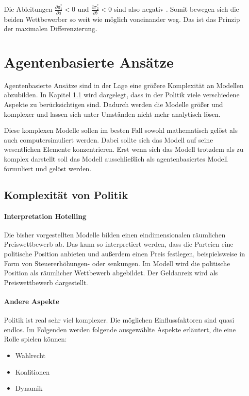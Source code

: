 Die Ableitungen $\frac{\partial \pi_1^*}{\partial a}<0$ und $\frac{\partial \pi_2^*}{\partial b}<0$ sind also negativ \citep[S.\,1149]{aspremont1979}.
Somit bewegen sich die beiden Wettbewerber so weit wie möglich voneinander weg. Das ist das Prinzip der maximalen Differenzierung.

\section{Agentenbasierte Ansätze}\label{Sec-ABM}

Agentenbasierte Ansätze sind in der Lage eine größere Komplexität an Modellen abzubilden.
In Kapitel \ref{sec:ABM-Komplexität} wird dargelegt, dass in der Politik viele verschiedene Aspekte zu berücksichtigen sind.
Dadurch werden die Modelle größer und komplexer und lassen sich unter Umständen nicht mehr analytisch lösen.

Diese komplexen Modelle sollen im besten Fall sowohl mathematisch gelöst als auch computersimuliert werden. Dabei sollte sich das Modell auf seine wesentlichen Elemente konzentrieren. Erst wenn sich das Modell trotzdem als zu komplex darstellt soll das Modell ausschließlich als agentenbasiertes Modell formuliert und gelöst werden. \citep[S.\,13ff]{marchi2014ABMs}

\subsection{Komplexität von Politik} \label{sec:ABM-Komplexität}
\paragraph{Interpretation Hotelling}
Die bisher vorgestellten Modelle bilden einen eindimensionalen räumlichen Preiswettbewerb ab.
Das kann so interpretiert werden, dass die Parteien eine politische Position anbieten und außerdem einen Preis festlegen, beispielsweise in Form von Steuererhöhungen- oder senkungen.
Im Modell wird die politische Position als räumlicher Wettbewerb abgebildet.
Der Geldanreiz wird als Preiswettbewerb dargestellt.

\paragraph{Andere Aspekte}
Politik ist real sehr viel komplexer.
Die möglichen Einflussfaktoren sind quasi endlos.
Im Folgenden werden folgende ausgewählte Aspekte erläutert, die eine Rolle spielen können:
\begin{itemize}
	\item Wahlrecht
	\item Koalitionen
	\item Dynamik
\end{itemize}

